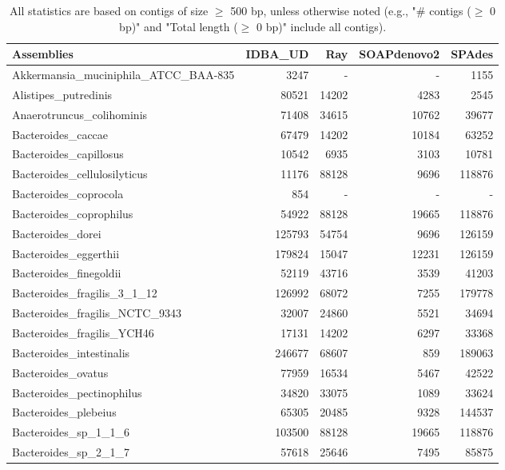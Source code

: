 \documentclass[12pt,a4paper]{article}
\begin{document}
\begin{table}[ht]
\begin{center}
\caption{All statistics are based on contigs of size $\geq$ 500 bp, unless otherwise noted (e.g., "\# contigs ($\geq$ 0 bp)" and "Total length ($\geq$ 0 bp)" include all contigs).}
\begin{tabular}{|l*{4}{|r}|}
\hline
Assemblies & IDBA\_UD & Ray & SOAPdenovo2 & SPAdes \\ \hline
Akkermansia\_muciniphila\_ATCC\_BAA-835 & 3247 & - & - & 1155 \\ \hline
Alistipes\_putredinis & 80521 & 14202 & 4283 & 2545 \\ \hline
Anaerotruncus\_colihominis & 71408 & 34615 & 10762 & 39677 \\ \hline
Bacteroides\_caccae & 67479 & 14202 & 10184 & 63252 \\ \hline
Bacteroides\_capillosus & 10542 & 6935 & 3103 & 10781 \\ \hline
Bacteroides\_cellulosilyticus & 11176 & 88128 & 9696 & 118876 \\ \hline
Bacteroides\_coprocola & 854 & - & - & - \\ \hline
Bacteroides\_coprophilus & 54922 & 88128 & 19665 & 118876 \\ \hline
Bacteroides\_dorei & 125793 & 54754 & 9696 & 126159 \\ \hline
Bacteroides\_eggerthii & 179824 & 15047 & 12231 & 126159 \\ \hline
Bacteroides\_finegoldii & 52119 & 43716 & 3539 & 41203 \\ \hline
Bacteroides\_fragilis\_3\_1\_12 & 126992 & 68072 & 7255 & 179778 \\ \hline
Bacteroides\_fragilis\_NCTC\_9343 & 32007 & 24860 & 5521 & 34694 \\ \hline
Bacteroides\_fragilis\_YCH46 & 17131 & 14202 & 6297 & 33368 \\ \hline
Bacteroides\_intestinalis & 246677 & 68607 & 859 & 189063 \\ \hline
Bacteroides\_ovatus & 77959 & 16534 & 5467 & 42522 \\ \hline
Bacteroides\_pectinophilus & 34820 & 33075 & 1089 & 33624 \\ \hline
Bacteroides\_plebeius & 65305 & 20485 & 9328 & 144537 \\ \hline
Bacteroides\_sp\_1\_1\_6 & 103500 & 88128 & 19665 & 118876 \\ \hline
Bacteroides\_sp\_2\_1\_7 & 57618 & 25646 & 7495 & 85875 \\ \hline

\end{tabular}
\end{center}
\end{table}
\end{document}
